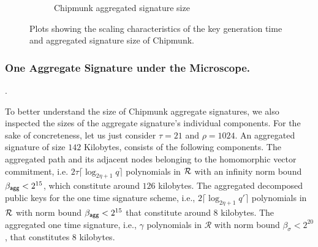 \begin{figure}[H]
\begin{subfigure}[b]{0.49\textwidth}
  \caption{Chipmunk aggregated signature size}
  \label{fig:sigize}
  \end{subfigure}
  \caption{Plots showing the scaling characteristics of the key generation time and aggregated signature size of Chipmunk.} \label{fig:keygen}
\end{figure}

\subsubsection{One Aggregate Signature under the Microscope.}

\mbox{}.

To better understand the size of Chipmunk aggregate signatures, we also inspected the sizes of the aggregate signature's individual components.
For the sake of concreteness, let us just consider $\tau=21$ and $\rho=1024$.
An aggregated signature of size $142$ Kilobytes, consists of the following components.
The aggregated path and its adjacent nodes belonging to the homomorphic vector commitment, i.e. $2\tau\lceil\log_{2\eta+1}q\rceil$ polynomials in $\mathcal{R}$ with an infinity norm bound $\beta_{\mathsf{agg}} <2^{15}$, which constitute around $126$ kilobytes.
The aggregated decomposed public keys for the one time signature scheme, i.e., $2\lceil\log_{2\eta+1}q'\rceil$ polynomials in $\mathcal{R}$ with norm bound $\beta_{\mathsf{agg}} < 2^{15}$ that constitute around $8$ kilobytes.
The aggregated one time signature, i.e., $\gamma$ polynomials in $\mathcal{R}$ with norm bound $\beta_\sigma < 2^{20}$, that constitutes $8$ kilobytes.
